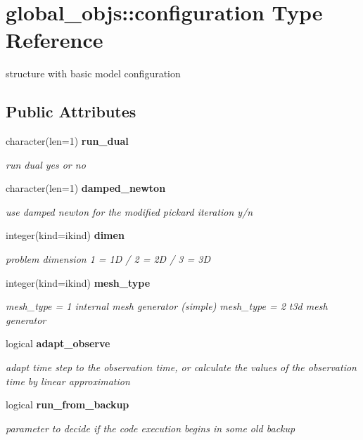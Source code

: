 \section{global\+\_\+objs\+:\+:configuration Type Reference}
\label{structglobal__objs_1_1configuration}


structure with basic model configuration  


\subsection*{Public Attributes}
\begin{DoxyCompactItemize}
\item 
character(len=1) {\bf run\+\_\+dual}
\begin{DoxyCompactList}\small\item\em run dual yes or no \end{DoxyCompactList}\item 
character(len=1) {\bf damped\+\_\+newton}
\begin{DoxyCompactList}\small\item\em use damped newton for the modified pickard iteration y/n \end{DoxyCompactList}\item 
integer(kind=ikind) {\bf dimen}
\begin{DoxyCompactList}\small\item\em problem dimension 1 = 1D / 2 = 2D / 3 = 3D \end{DoxyCompactList}\item 
integer(kind=ikind) {\bf mesh\+\_\+type}
\begin{DoxyCompactList}\small\item\em mesh\+\_\+type = 1 internal mesh generator (simple) mesh\+\_\+type = 2 t3d mesh generator \end{DoxyCompactList}\item 
logical {\bf adapt\+\_\+observe}
\begin{DoxyCompactList}\small\item\em adapt time step to the observation time, or calculate the values of the observation time by linear approximation \end{DoxyCompactList}\item 
logical {\bf run\+\_\+from\+\_\+backup}
\begin{DoxyCompactList}\small\item\em parameter to decide if the code execution begins in some old backup \end{DoxyCompactList}\item 

\end{DoxyCompactItemize}
